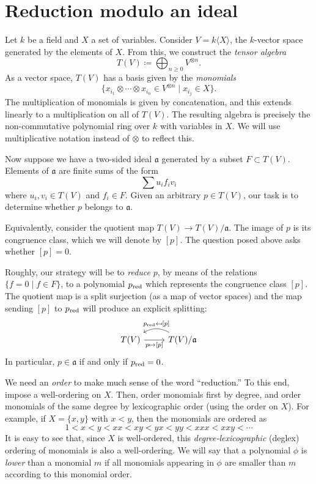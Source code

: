 \section{Reduction modulo an ideal}\label{sec:grobner-theorem}
Let $k$ be a field and $X$ a set of variables. Consider $V = k\langle X \rangle$, the $k$-vector space generated by the elements of $X$. From this, we construct the \emph{tensor algebra}
\[
	T(V) \coloneqq \bigoplus_{n\geq 0} V^{\otimes n}.
\]
As a vector space, $T(V)$ has a basis given by the \emph{monomials}
\[
	\{x_{i_1}\otimes \cdots \otimes x_{i_n} \in V^{\otimes n} \mid x_{i_j} \in X\}.
\]
The multiplication of monomials is given by concatenation, and this extends linearly to a multiplication on all of $T(V)$. The resulting algebra is precisely the non-commutative polynomial ring over $k$ with variables in $X$. We will use multiplicative notation instead of $\otimes$ to reflect this.

Now suppose we have a two-sided ideal $\mathfrak{a}$ generated by a subset $F\subset T(V)$. Elements of $\mathfrak{a}$ are finite sums of the form
\[
	\sum u_i f_i v_i
\]
where $u_i, v_i \in T(V)$ and $f_i \in F$.
Given an arbitrary $p\in T(V)$, our task is to determine whether $p$ belongs to $\mathfrak{a}$.

Equivalently, consider the quotient map $T(V) \to T(V)/\mathfrak{a}$. The image of $p$ is its congruence class, which we will denote by $[p]$. The question posed above asks whether $[p]=0$.

Roughly, our strategy will be to \emph{reduce} $p$, by means of the relations $\{f=0 \mid f\in F\}$, to a polynomial $p_{\mathrm{red}}$ which represents the congruence class $[p]$. The quotient map is a split surjection (as a map of vector spaces) and the map sending $[p]$ to $p_{\mathrm{red}}$ will produce an explicit splitting:
\[\begin{tikzcd}
	T(V) \arrow[r, "p \mapsto {[p]}",swap] & \arrow[l,bend right, swap," p_\red \mapsfrom {[p]}"] T(V)/\mathfrak{a}
\end{tikzcd}\]
In particular, $p \in \mathfrak{a}$ if and only if $p_{\mathrm{red}} = 0$.

We need an \emph{order} to make much sense of the word ``reduction.'' To this end, impose a well-ordering on $X$. Then, order monomials first by degree, and order monomials of the same degree by lexicographic order (using the order on $X$). For example, if $X = \{x,y\}$ with $x < y$, then the monomials are ordered as
\[
	1 < x < y < xx < xy < yx < yy < xxx < xxy < \cdots
\]
It is easy to see that, since $X$ is well-ordered, this \emph{degree-lexicographic} (deglex) ordering of monomials is also a well-ordering. We will say that a polynomial $\phi$ is \emph{lower} than a monomial $m$ if all monomials appearing in $\phi$ are smaller than $m$ according to this monomial order.

